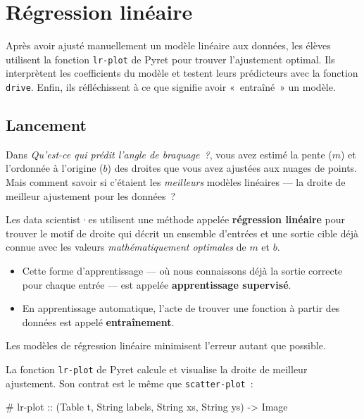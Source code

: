 \documentclass[12pt,a4paper]{article}
\newcommand{\contrat}[1]{%
  \begin{contractbox}
    \ttfamily #1
  \end{contractbox}
}
\begin{document}
\newpage

\section{Régression linéaire}

\begin{overviewbox}
  Après avoir ajusté manuellement un modèle linéaire aux données, les élèves utilisent la fonction \texttt{lr-plot} de Pyret pour trouver l'ajustement optimal. Ils interprètent les coefficients du modèle et testent leurs prédicteurs avec la fonction \texttt{drive}. Enfin, ils réfléchissent à ce que signifie avoir «~entraîné~» un modèle.
\end{overviewbox}

\subsection{Lancement}

Dans \emph{Qu'est-ce qui prédit l'angle de braquage~?}, vous avez estimé la pente ($m$) et l'ordonnée à l'origine ($b$) des droites que vous avez ajustées aux nuages de points. Mais comment savoir si c'étaient les \emph{meilleurs} modèles linéaires — la droite de meilleur ajustement pour les données~?

\begin{keypointbox}
  Les data scientist·es utilisent une méthode appelée \textbf{régression linéaire} pour trouver le motif de droite qui décrit un ensemble d'entrées et une sortie cible déjà connue avec les valeurs \emph{mathématiquement optimales} de $m$ et $b$.

  \begin{itemize}
    \item Cette forme d'apprentissage — où nous connaissons déjà la sortie correcte pour chaque entrée — est appelée \textbf{apprentissage supervisé}.
    \item En apprentissage automatique, l'acte de trouver une fonction à partir des données est appelé \textbf{entraînement}.
  \end{itemize}

  Les modèles de régression linéaire minimisent l'erreur autant que possible.

  La fonction \texttt{lr-plot} de Pyret calcule et visualise la droite de meilleur ajustement. Son contrat est le même que \texttt{scatter-plot}~:

  \contrat{\# lr-plot :: (Table t, String labels, String xs, String ys) -> Image}
\end{keypointbox}
\end{document}
